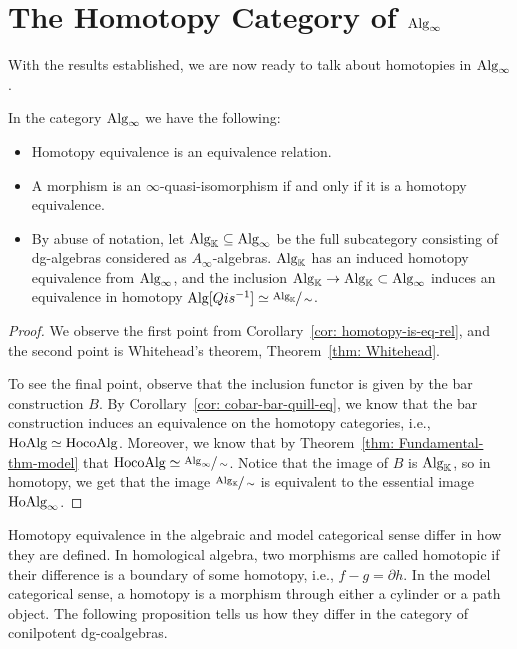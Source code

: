 \documentclass[../thesis.tex]{subfiles}
\begin{document}
    \section{The Homotopy Category of $\tt{Alg}_\infty$}

    With the results established, we are now ready to talk about homotopies in $\tt{Alg}_\infty$.

    \begin{thm}\label{thm: model-Alg-inf}
        In the category $\tt{Alg}_\infty$ we have the following:
        \begin{itemize}
            \item Homotopy equivalence is an equivalence relation.
            \item A morphism is an $\infty$-quasi-isomorphism if and only if it is a homotopy equivalence.
            \item By abuse of notation, let $\tt{Alg}_\mathbb{K} \subseteq \tt{Alg}_\infty$ be the full subcategory consisting of dg-algebras considered as $A_\infty$-algebras. $\tt{Alg}_\mathbb{K}$ has an induced homotopy equivalence from $\tt{Alg}_\infty$, and the inclusion $\tt{Alg}_\mathbb{K} \rightarrow \tt{Alg}_\mathbb{K} \subset \tt{Alg}_\infty$ induces an equivalence in homotopy $\tt{Alg}[Qis^{-1}] \simeq \sfrac{\tt{Alg}_\mathbb{K}}{\sim}$.
        \end{itemize}
    \end{thm}

    \begin{proof}
        We observe the first point from Corollary~\ref{cor: homotopy-is-eq-rel}, and the second point is Whitehead's theorem, Theorem~\ref{thm: Whitehead}.

        To see the final point, observe that the inclusion functor is given by the bar construction $B$. By Corollary~\ref{cor: cobar-bar-quill-eq}, we know that the bar construction induces an equivalence on the homotopy categories, i.e., $\tt{Ho}\tt{Alg} \simeq \tt{Ho}\tt{coAlg}$. Moreover, we know that by Theorem~\ref{thm: Fundamental-thm-model} that $\tt{Ho}\tt{coAlg} \simeq \sfrac{\tt{Alg}_\infty}{\sim}$. Notice that the image of $B$ is $\tt{Alg}_\mathbb{K}$, so in homotopy, we get that the image $\sfrac{\tt{Alg}_\mathbb{K}}{\sim}$ is equivalent to the essential image $\tt{Ho}\tt{Alg}_\infty$.
    \end{proof}

    Homotopy equivalence in the algebraic and model categorical sense differ in how they are defined. In homological algebra, two morphisms are called homotopic if their difference is a boundary of some homotopy, i.e., $f-g = \partial h$. In the model categorical sense, a homotopy is a morphism through either a cylinder or a path object. The following proposition tells us how they differ in the category of conilpotent dg-coalgebras. 
\end{document}

